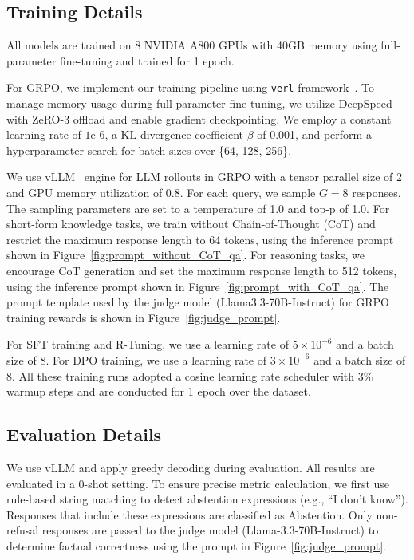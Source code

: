 \documentclass{article} %
\begin{document}
\subsection{Training Details}
\label{app:Training_Details}
All models are trained on 8 NVIDIA A800 GPUs with 40GB memory using full-parameter fine-tuning and trained for 1 epoch.

For GRPO, we implement our training pipeline using \texttt{verl} framework~\citep{verl}. To manage memory usage during full-parameter fine-tuning, we utilize DeepSpeed~\citep{deepspeed} with ZeRO-3 offload and enable gradient checkpointing.
We employ a constant learning rate of $1\text{e-}6$, a KL divergence coefficient $\beta$ of 0.001, and perform a hyperparameter search for batch sizes over \{64, 128, 256\}.

We use vLLM~\citep{vllm} engine for LLM rollouts in GRPO with a tensor parallel size of 2 and GPU memory utilization of 0.8. For each query, we sample $G=8$ responses. The sampling parameters are set to a temperature of 1.0 and top-p of 1.0. For short-form knowledge tasks, we train without Chain-of-Thought (CoT) and restrict the maximum response length to 64 tokens, using the inference prompt shown in Figure~\ref{fig:prompt_without_CoT_qa}. For reasoning tasks, we encourage CoT generation and set the maximum response length to 512 tokens, using the inference prompt shown in Figure~\ref{fig:prompt_with_CoT_qa}. The prompt template used by the judge model (Llama3.3-70B-Instruct) for GRPO training rewards is shown in Figure~\ref{fig:judge_prompt}.

For SFT training and R-Tuning, we use a learning rate of $5 \times 10^{-6}$ and a batch size of 8. For DPO training, we use a learning rate of $3\times 10^{-6}$ and a batch size of 8. All these training runs adopted a cosine learning rate scheduler with $3\%$ warmup steps and are conducted for 1 epoch over the dataset.


\subsection{Evaluation Details}
We use vLLM and apply greedy decoding during evaluation. All results are evaluated in a 0-shot setting.
To ensure precise metric calculation, we first use rule-based string matching to detect abstention expressions (e.g., ``I don't know''). Responses that include these expressions are classified as Abstention.
Only non-refusal responses are passed to the judge model (Llama-3.3-70B-Instruct) to determine factual correctness using the prompt in Figure~\ref{fig:judge_prompt}.
\end{document}
